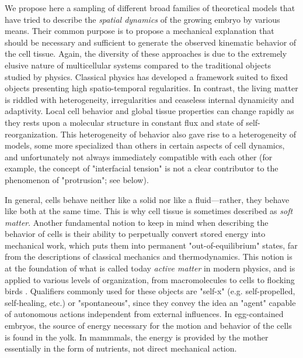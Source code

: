 We propose here a sampling of different broad families of theoretical models that have tried to describe the \textit{spatial dynamics} of the growing embryo by various means. Their common purpose is to propose a mechanical explanation that should be necessary and sufficient to generate the observed kinematic behavior of the cell tissue. Again, the diversity of these approaches is due to the extremely elusive nature of multicellular systems compared to the traditional objects studied by physics. Classical physics has developed a framework suited to fixed objects presenting high spatio-temporal regularities. In contrast, the living matter is riddled with heterogeneity, irregularities and ceaseless internal dynamicity and adaptivity. Local cell behavior and global tissue properties can change rapidly as they rests upon a molecular structure in constant flux and state of self-reorganization. This heterogeneity of behavior also gave rise to a heterogeneity of models, some more specialized than others in certain aspects of cell dynamics, and unfortunately not always immediately compatible with each other (for example, the concept of "interfacial tension" is not a clear contributor to the phenomenon of "protrusion"; see below).  

In general, cells behave neither like a solid nor like a fluid---rather, they behave like both at the same time. This is why cell tissue is sometimes described as \textit{soft matter}. Another fundamental notion to keep in mind when describing the behavior of cells is their ability to perpetually convert stored energy into mechanical work, which puts them into permanent "out-of-equilibrium" states, far from the descriptions of classical mechanics and thermodynamics. This notion is at the foundation of what is called today \textit{active matter} in modern physics, and is applied to various levels of organization, from macromolecules to cells to flocking birds \cite{Ramaswamy:2010bf}. Qualifiers commonly used for these objects are "self-x" (e.g. self-propelled, self-healing, etc.) or "spontaneous", since they convey the idea an "agent" capable of autonomous actions independent from external influences. In egg-contained embryos, the source of energy necessary for the motion and behavior of the cells is found in the yolk. In mammmals, the energy is provided by the mother essentially in the form of nutrients, not direct mechanical action.

